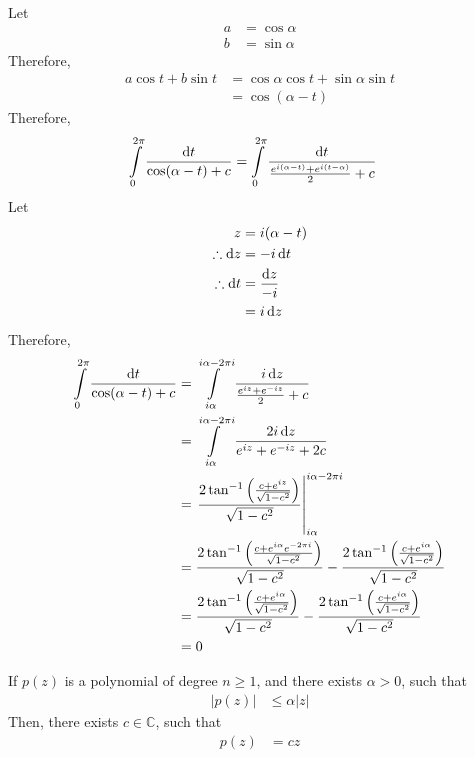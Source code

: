 \documentclass[fleqn, a4paper, 11pt, oneside]{amsart}
\theoremstyle{definition}
\theoremstyle{theorem}
\begin{document}
\begin{solution}
	Let
	\begin{align*}
		a &= \cos \alpha\\
		b &= \sin \alpha
	\end{align*}
	Therefore,
	\begin{align*}
		a \cos t + b \sin t &= \cos \alpha \cos t + \sin \alpha \sin t\\
		&= \cos(\alpha - t)
	\end{align*}
	Therefore,
	\begin{align*}
		\int\limits_{0}^{2 \pi} \frac{\dif t}{\cos(\alpha - t) + c} &= \int\limits_{0}^{2 \pi} \frac{\dif t}{\frac{e^{i (\alpha - t)} + e^{i (t - \alpha)}}{2} + c}
	\end{align*}
	Let
	\begin{align*}
		z &= i (\alpha - t)\\
		\therefore \dif z &= -i \dif t\\
		\therefore \dif t &= \frac{\dif z}{-i}\\
		&= i \dif z
	\end{align*}
	Therefore,
	\begin{align*}
		\int\limits_{0}^{2 \pi} \frac{\dif t}{\cos(\alpha - t) + c} &= \int\limits_{i \alpha}^{i \alpha - 2 \pi i} \frac{i \dif z}{\frac{e^{i z} + e^{-i z}}{2} + c}\\
		&= \int\limits_{i \alpha}^{i \alpha - 2 \pi i} \frac{2 i \dif z}{e^{i z} + e^{-i z} + 2 c}\\
		&= \left. \frac{2 \tan ^{-1}\left( \frac{c + e^{i z}}{\sqrt{1 - c^2}}\right)}{\sqrt{1 - c^2}} \right|_{i \alpha}^{i \alpha - 2 \pi i}\\
		&= \frac{2 \tan^{-1} \left( \frac{c + e^{i \alpha} e^{-2 \pi i}}{\sqrt{1 - c^2}} \right)}{\sqrt{1 - c^2}} - \frac{2 \tan^{-1} \left( \frac{c + e^{i \alpha}}{\sqrt{1 - c^2}} \right)}{\sqrt{1 - c^2}}\\
		&= \frac{2 \tan^{-1} \left( \frac{c + e^{i \alpha} }{\sqrt{1 - c^2}} \right)}{\sqrt{1 - c^2}} - \frac{2 \tan^{-1} \left( \frac{c + e^{i \alpha}}{\sqrt{1 - c^2}} \right)}{\sqrt{1 - c^2}}\\
		&= 0
	\end{align*}
\end{solution}

\setcounter{question}{4}
\begin{question}
	If $p(z)$ is a polynomial of degree $n \ge 1$, and there exists $\alpha > 0$, such that
	\begin{align*}
		\left| p(z) \right| &\le \alpha |z|
	\end{align*}
	Then, there exists $c \in \mathbb{C}$, such that
	\begin{align*}
		p(z) &= c z
	\end{align*}
\end{question}
\end{document}
